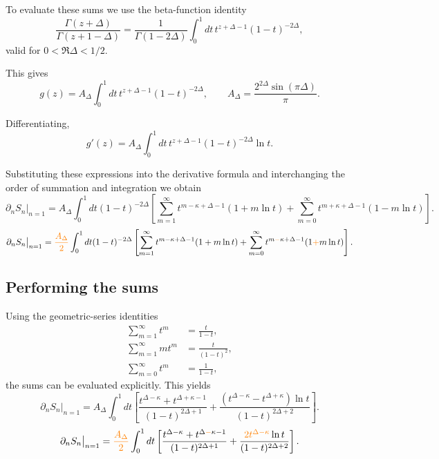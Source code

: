 \documentclass[11pt]{article}
\newcommand{\JM}[1]{\textcolor{orange}{#1}}
\begin{document}
To evaluate these sums we use the beta-function identity
\begin{equation}
\frac{\Gamma(z+\Delta)}{\Gamma(z+1-\Delta)}
=
\frac{1}{\Gamma(1-2\Delta)}
\int_0^1 dt\, t^{z+\Delta-1}(1-t)^{-2\Delta},
\end{equation}
valid for $0<\Re\Delta<1/2$.

This gives
\begin{equation}
g(z)=A_\Delta\int_0^1 dt\, t^{z+\Delta-1}(1-t)^{-2\Delta},
\qquad
A_\Delta=\frac{2^{2\Delta}\sin(\pi\Delta)}{\pi}.
\end{equation}

Differentiating,
\begin{equation}
g'(z)=A_\Delta\int_0^1 dt\, t^{z+\Delta-1}(1-t)^{-2\Delta}\ln t .
\end{equation}

Substituting these expressions into the derivative formula and
interchanging the order of summation and integration we obtain
\begin{equation}
\partial_n S_n\big|_{n=1}=
A_\Delta\int_0^1 dt (1-t)^{-2\Delta}
\left[
\sum_{m=1}^\infty t^{m-\kappa+\Delta-1}(1+m\ln t)
+
\sum_{m=0}^\infty t^{m+\kappa+\Delta-1}(1-m\ln t)
\right].
\end{equation}
\begin{equation}
\partial_n S_n\big|_{n=1}=
\JM{\frac{A_\Delta}{2}}\int_0^1 dt (1-t)^{-2\Delta}
\left[
\sum_{m=1}^\infty t^{m-\kappa+\Delta-1}(1+m\ln t)
+
\sum_{m=0}^\infty t^{m\JM{-}\kappa+\Delta-1}(1\JM{+}m\ln t)
\right].
\end{equation}

\subsection{Performing the sums}

Using the geometric-series identities
\begin{align}
\sum_{m=1}^\infty t^m &=\frac{t}{1-t},\\
\sum_{m=1}^\infty m t^m &=\frac{t}{(1-t)^2},\\
\sum_{m=0}^\infty t^m &=\frac{1}{1-t},
\end{align}
the sums can be evaluated explicitly.  This yields
\begin{equation}
\partial_n S_n\big|_{n=1}=
A_\Delta\int_0^1 dt
\left[
\frac{t^{\Delta-\kappa}+t^{\Delta+\kappa-1}}{(1-t)^{2\Delta+1}}
+
\frac{(t^{\Delta-\kappa}-t^{\Delta+\kappa})\ln t}{(1-t)^{2\Delta+2}}
\right].
\end{equation}
\begin{equation}
\partial_n S_n\big|_{n=1}=
\JM{\frac{A_\Delta}{2}}\int_0^1 dt
\left[
\frac{t^{\Delta-\kappa}+t^{\Delta\JM{-}\kappa-1}}{(1-t)^{2\Delta+1}}
+
\frac{\JM{2t^{\Delta-\kappa}}\ln t}{(1-t)^{2\Delta+2}}
\right].
\end{equation}
\end{document}
